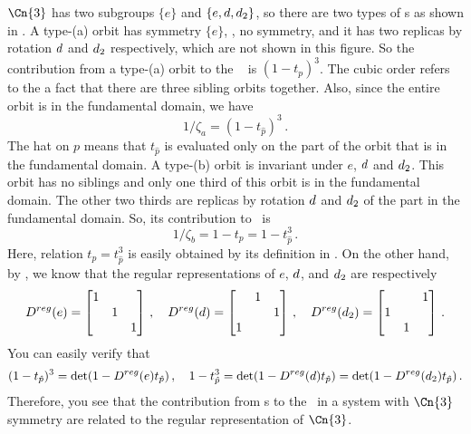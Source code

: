 $\Cn{3}$ has two subgroups $\{e\}$ and $\{e, d, d_2\}$, so there
are two types of \po s as shown in . A type-(a)
orbit has symmetry $\{e\}$, \ie, no symmetry, and it has two replicas by
rotation $d$  and $d_2$ respectively, which are not shown in
this figure. So the contribution from
a type-(a) orbit to the \dzeta\
is $(1-t_p)^3$.
The cubic order refers to the a fact that there are three sibling orbits together.
Also, since the entire orbit is in the fundamental domain, we have
\[
  1/\zeta_a = (1 - t_{\hat{p}})^3
  \,.
\]
The hat on $p$ means that $t_{\hat{p}}$ is evaluated only on the part of the orbit that
is in the fundamental domain.
A type-(b) orbit is invariant under $e$, $d$ and $d_2$.
This orbit has no siblings and only one third
of this orbit is in the fundamental domain. The other two thirds are replicas
by rotation $d$  and $d_2$ of the part in the fundamental domain. So, its
contribution to \dzeta\ is
\[
  1/\zeta_b = 1 - t_p = 1 - t_{\hat{p}}^3
  \,.
\]
Here, relation $t_p= t_{\hat{p}}^3$ is easily obtained by its definition in
\refeq{eq:zeta}.
On the other hand, by ,
we know that the regular representations of $e$,
$d$, and $d_2$ are respectively
\[
  D^{reg}(e) = %
  \begin{bmatrix}
    1 & & \\
    & 1 & \\
    & & 1 \\
  \end{bmatrix} \,,  \quad
  D^{reg}(\shift) = %
  \begin{bmatrix}
    ~ & 1 & ~\\
    ~ & ~ & 1\\
    1 & ~ & ~ \\
  \end{bmatrix}\,,  \quad
  D^{reg}(\shift_2) =
  \begin{bmatrix}
    ~ & ~ & 1\\
    1 & ~ & ~\\
    ~ & 1 & ~ \\
  \end{bmatrix}
  \,.
\]
You can easily verify that
\[
 (1 - t_{\hat{p}})^3 = \det(1 - D^{reg}(e)t_{\hat{p}}) \,, \quad
 1 - t_{\hat{p}}^3 = \det(1 - D^{reg}(d)t_{\hat{p}}) =
 \det(1 - D^{reg}(d_2)t_{\hat{p}})\,.
\]
Therefore, you see that the contribution from \po s to the
\dzeta\ in a system with $\Cn{3}$
symmetry are related to the regular representation of $\Cn{3}$.

